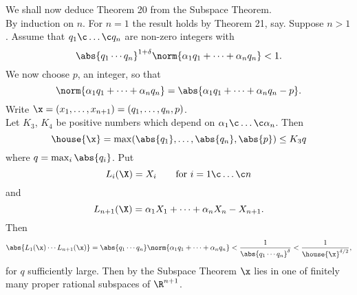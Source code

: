 We shall now deduce Theorem 20 from the Subspace Theorem. \\
\pf By induction on $n$.  For $n=1$ the result holds by Theorem 21, say.  Suppose $n>1$.  Assume that $q_1\c \dotsc\c q_n$ are non-zero integers with
\[ \abs{q_1\dotsm q_n}^{1+\delta} \norm{\alpha_1q_1+\dotsb+\alpha_nq_n} < 1 . \]
We now choose $p$, an integer, so that
\[ \norm{\alpha_1q_1+\dotsb+\alpha_nq_n} = \abs{\alpha_1q_1+\dotsb+\alpha_nq_n-p} . \]
Write $\x=(x_1,\dotsc,x_{n+1})=(q_1,\dotsc,q_n,p)$. \\
Let $K_3$, $K_4$ be positive numbers which depend on $\alpha_1\c \dotsc\c \alpha_n$.  Then
\[ \house{\x} = \max(\abs{q_1},\dotsc,\abs{q_n},\abs{p}) \leq K_3 q \]
where $q=\max_i\abs{q_i}$.  Put
\[ L_i(\X) = X_i \qquad\text{for $i=1\c \dotsc\c n$} \]
and
\[ L_{n+1}(\X) = \alpha_1X_1 + \dotsb + \alpha_nX_n - X_{n+1} . \]
Then
\[ \abs{L_1(\x)\dotsm L_{n+1}(\x)} = \abs{q_1\dotsm q_n}\norm{\alpha_1q_1+\dotsb+\alpha_nq_n} < \frac{1}{\abs{q_1\dotsm q_n}^\delta} < \frac{1}{\house{\x}^{\delta/2}} , \]
for $q$ sufficiently large.  Then by the Subspace Theorem $\x$ lies in one of finitely many proper rational subspaces of $\R^{n+1}$.
